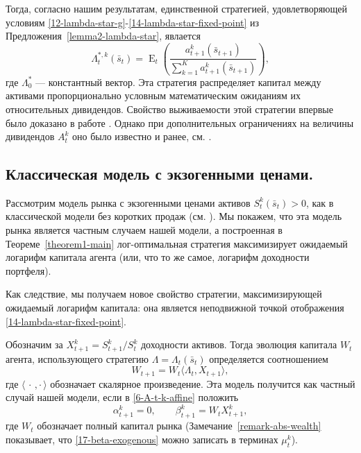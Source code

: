 \documentclass[a4paper,12pt,russian]{article} %
\theoremstyle{definition}
\DeclareMathOperator{\E}{E}
\begin{document}
Тогда, согласно нашим результатам, единственной стратегией, удовлетворяющей условиям \eqref{12-lambda-star-g}-\eqref{14-lambda-star-fixed-point} из Предложения~\ref{lemma2-lambda-star}, явлается \[
\Lambda_{t}^{*,k}(\bar s_t) 
= \E_t\left(\frac{a_{t+1}^k(\bar s_{t+1})}{\sum_{k=1}^K a_{t+1}^k(\bar s_{t+1})}\right),
\]
где $\Lambda^*_0$ — константный вектор. 
Эта стратегия распределяет капитал между активами пропорционально условным математическим ожиданиям их относительных дивидендов. Свойство выживаемости этой стратегии впервые было доказано в работе \cite{Amir2013}. Однако при дополнительных ограничениях на величины дивидендов $A_{t}^k$ оно было известно и ранее, см. \cite{BlumeEasley1992, AmirEvstigneev2005, Evstigneev2002}.


\subsection{Классическая модель с экзогенными ценами.}
Рассмотрим модель рынка с экзогенными ценами активов $S_{t}^k(\bar s_t)>0$, 
как в классической модели без коротких продаж  (см. \cite[Гл.~5]{FollmerSchied2011}). Мы покажем, что эта модель рынка является частным случаем нашей модели, а построенная в Теореме~\ref{theorem1-main} лог-оптимальная стратегия максимизирует ожидаемый логарифм капитала агента (или, что то же самое, логарифм доходности портфеля).

Как следствие, мы получаем новое свойство стратегии, максимизирующей ожидаемый логарифм капитала: она является неподвижной точкой отображения \eqref{14-lambda-star-fixed-point}.

Обозначим за  $X_{t+1}^k = S_{t+1}^k/S_{t}^k$ доходности активов.
Тогда эволюция капитала $W_t$ агента, использующего стратегию $\Lambda = \Lambda_t(\bar s_t)$ определяется соотношением
\[
W_{t+1} = W_t \langle \Lambda_t, X_{t+1}\rangle,
\]
где $\langle\,\cdot\,,\cdot\,\rangle$ обозначает скалярное произведение.
Эта модель получится как частный случай нашей модели, если в \eqref{6-A-t-k-affine} положить 
\begin{equation}
\label{17-beta-exogenous}
\alpha_{t+1}^k = 0, \qquad \beta_{t+1}^k = W_t X_{t+1}^k,
\end{equation}
где $W_t$ обозначает полный капитал рынка (Замечание~\ref{remark-abs-wealth} показывает, что  \eqref{17-beta-exogenous} можно записать в терминах $\mu_{t}^k$).
\end{document}
